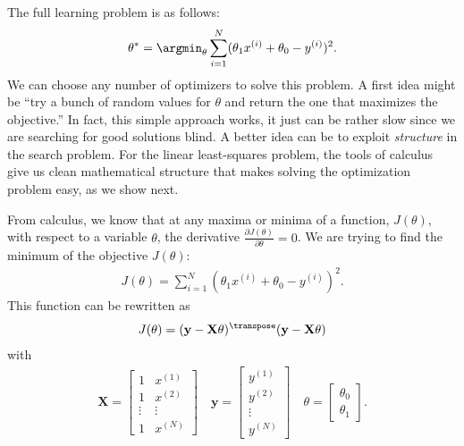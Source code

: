 
The full learning problem is as follows:
\begin{align}
    \theta^* = \argmin_{\theta} \sum_{i=1}^N (\theta_1 x^{(i)} + \theta_0 - y^{(i)})^2.
\end{align}
We can choose any number of optimizers to solve this problem. A first idea might be ``try a bunch of random values for $\theta$ and return the one that maximizes the objective.'' In fact, this simple approach works, it just can be rather slow since we are searching for good solutions blind. A better idea can be to exploit \textit{structure} in the search problem. For the linear least-squares problem, the tools of calculus give us clean mathematical structure that makes solving the optimization problem easy, as we show next.

From calculus, we know that at any maxima or minima of a function, $J(\theta)$, with respect to a variable $\theta$, the derivative $\frac{\partial{J(\theta)}}{\partial{\theta}} = 0$. We are trying to find the minimum of the objective $J(\theta)$:
\begin{align}
    J(\theta) = \sum_{i=1}^N (\theta_1 x^{(i)} + \theta_0 - y^{(i)})^2.
\end{align}
This function can be rewritten as
\begin{align}
    J(\theta) = (\mathbf{y} - \mathbf{X}\theta)^\transpose(\mathbf{y} - \mathbf{X}\theta)
\end{align}
with
\begin{align}
\mathbf{X} = 
 \begin{bmatrix}
    1 & x^{(1)}  \\
    1 & x^{(2)} \\
    \vdots & \vdots \\
    1 & x^{(N)}
\end{bmatrix}
\quad
\mathbf{y} = 
 \begin{bmatrix}
    y^{(1)}  \\
    y^{(2)} \\
    \vdots \\
    y^{(N)}
\end{bmatrix}
\quad
\theta = 
 \begin{bmatrix}
    \theta_0 \\
    \theta_1
\end{bmatrix}.
\end{align}

